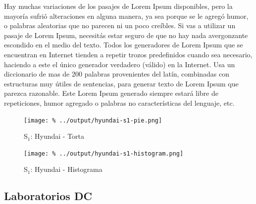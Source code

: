 \documentclass[final,narroweqnarray,inline]{ieee}
\begin{document}
Hay muchas variaciones de los pasajes de Lorem Ipsum disponibles, pero la mayoría sufrió alteraciones en alguna manera, ya sea porque se le agregó humor, o palabras aleatorias que no parecen ni un poco creíbles. Si vas a utilizar un pasaje de Lorem Ipsum, necesitás estar seguro de que no hay nada avergonzante escondido en el medio del texto. Todos los generadores de Lorem Ipsum que se encuentran en Internet tienden a repetir trozos predefinidos cuando sea necesario, haciendo a este el único generador verdadero (válido) en la Internet. Usa un diccionario de mas de 200 palabras provenientes del latín, combinadas con estructuras muy útiles de sentencias, para generar texto de Lorem Ipsum que parezca razonable. Este Lorem Ipsum generado siempre estará libre de repeticiones, humor agregado o palabras no características del lenguaje, etc.

    \begin{figure}[ht]\begin{center}
      \texttt{[image: \%
      ../output/hyundai-s1-pie.png]}
      \vspace{-2em}
      \caption{S$_1$: Hyundai - Torta}
      \label{hyundai-s1-pie}
    \end{center}\end{figure}

    \begin{figure}[ht]\begin{center}
      \texttt{[image: \%
      ../output/hyundai-s1-histogram.png]}
      \vspace{-2em}
      \caption{S$_1$: Hyundai - Histograma}
      \label{hyundai-s1-histogram}
    \end{center}\end{figure}

  \subsection{Laboratorios DC}
\end{document}
